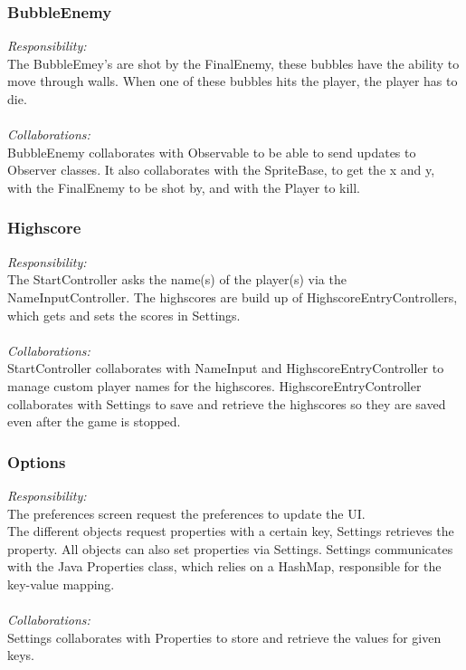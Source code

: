 \subsubsection{BubbleEnemy}
\textit{Responsibility:} \\
The BubbleEmey's are shot by the FinalEnemy, these bubbles have the ability to move through walls. When one of these bubbles hits the player, the player has to die. \\ \\
\textit{Collaborations:} \\
BubbleEnemy collaborates with Observable to be able to send updates to Observer classes. It also collaborates with  the SpriteBase, to get the x and y, with the FinalEnemy to be shot by, and with the Player to kill.

\subsubsection{Highscore}
\textit{Responsibility:} \\
The StartController asks the name(s) of the player(s) via the NameInputController. The highscores are build up of HighscoreEntryControllers, which gets and sets the scores in Settings. \\ \\
\textit{Collaborations:} \\
StartController collaborates with NameInput and HighscoreEntryController to manage custom player names for the highscores. HighscoreEntryController collaborates with Settings to save and retrieve the highscores so they are saved even after the game is stopped.

\subsubsection{Options}
\textit{Responsibility:} \\
The preferences screen request the preferences to update the UI. \\
The different objects request properties with a certain key, Settings retrieves the property. All objects can also set properties via Settings. Settings communicates with the Java Properties class, which relies on a HashMap, responsible for the key-value mapping. \\ \\
\textit{Collaborations:} \\
Settings collaborates with Properties to store and retrieve the values for given keys.

